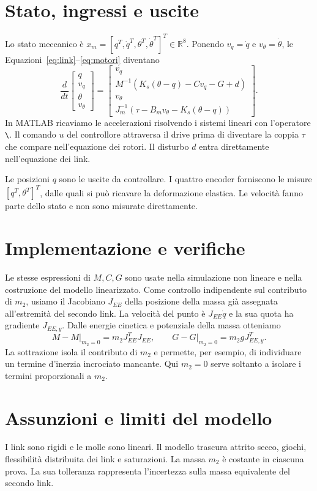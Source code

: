 \section{Stato, ingressi e uscite}
Lo stato meccanico è $x_m=[q^T,\dot q^T,\theta^T,\dot\theta^T]^T\in\mathbb R^8$.
Ponendo $v_q=\dot q$ e $v_\theta=\dot\theta$, le
Equazioni~\eqref{eq:link}--\eqref{eq:motori} diventano
\[
 \frac{d}{dt}\begin{bmatrix}q\\v_q\\\theta\\v_\theta\end{bmatrix}
 =\begin{bmatrix}v_q\\M^{-1}(K_s(\theta-q)-Cv_q-G+d)\\
 v_\theta\\J_m^{-1}(\tau-B_mv_\theta-K_s(\theta-q))\end{bmatrix}.
\]
In MATLAB ricaviamo le accelerazioni risolvendo i sistemi lineari con
l'operatore \texttt{\textbackslash}. Il comando $u$ del controllore
attraversa il drive prima di diventare la coppia $\tau$ che compare
nell'equazione dei rotori. Il disturbo $d$ entra direttamente
nell'equazione dei link.

Le posizioni $q$ sono le uscite da controllare. I quattro encoder
forniscono le misure $[q^T,\theta^T]^T$, dalle quali si può ricavare la
deformazione elastica. Le velocità fanno parte dello stato e non sono
misurate direttamente.

\section{Implementazione e verifiche}
Le stesse espressioni di $M,C,G$ sono usate nella simulazione non
lineare e nella costruzione del modello linearizzato. Come controllo
indipendente sul contributo di $m_2$, usiamo il Jacobiano $J_{EE}$ della
posizione della massa già assegnata all'estremità del secondo link.
La velocità del punto è $J_{EE}\dot q$ e la sua quota ha gradiente
$J_{EE,y}$. Dalle energie cinetica e potenziale della massa otteniamo
\[
 M-M\big|_{m_2=0}=m_2J_{EE}^TJ_{EE},\qquad
 G-G\big|_{m_2=0}=m_2gJ_{EE,y}^T.
\]
La sottrazione isola il contributo di $m_2$ e permette, per esempio,
di individuare un termine d'inerzia incrociato mancante. Qui
$m_2=0$ serve soltanto a isolare i termini proporzionali a $m_2$.

\section{Assunzioni e limiti del modello}
I link sono rigidi e le molle sono lineari. Il modello trascura
attrito secco, giochi, flessibilità distribuita dei link e saturazioni.
La massa $m_2$ è costante in ciascuna prova. La sua tolleranza
rappresenta l'incertezza sulla massa equivalente del secondo link.
